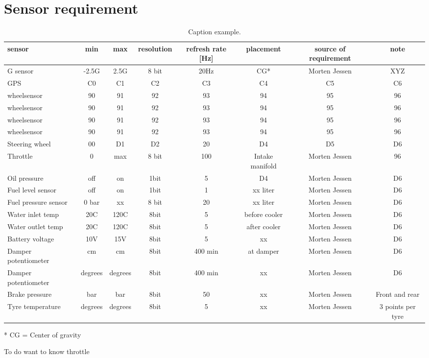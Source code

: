 \chapter{Sensor requirement}

\begin{landscape}
\begin{table}[htbp]
\centering
\begin{tabular} {l c c c c c c c }
\toprule
sensor & min	& max 	& resolution 	& refresh rate [Hz]	& placement 	& source of requirement & note	\\
\midrule
G sensor 	& -2.5G	& 2.5G	& 8 bit	 & 20Hz & CG* & Morten Jessen & XYZ\\
GPS 	& C0	& C1	& C2	& C3	& C4	& C5	& C6 \\
wheelsensor & 90	& 91	& 92	& 93	& 94	& 95	& 96 \\
wheelsensor & 90	& 91	& 92	& 93	& 94	& 95	& 96 \\
wheelsensor & 90	& 91	& 92	& 93	& 94	& 95	& 96 \\
wheelsensor & 90	& 91	& 92	& 93	& 94	& 95	& 96 \\
Steering wheel & 00	& D1	& D2	& 20		& D4				& D5			& D6 \\
Throttle  		& 0	& max	& 8 bit	&  100	& Intake manifold 	& Morten Jessen	& 96  \\
Oil pressure & off	& on	& 1bit 	& 5		& D4				& Morten Jessen			& D6 \\
Fuel level sensor & off	& on	& 1bit 	& 1		&  xx liter			& Morten Jessen			& D6 \\
Fuel pressure sensor & 0 bar	& xx	& 8 bit 	& 20		&  xx liter			& Morten Jessen			& D6 \\
Water inlet temp & 20C	& 120C	& 8bit 	& 5		&  before cooler			& Morten Jessen			& D6 \\
Water outlet temp & 20C	& 120C	& 8bit 	& 5		&  after cooler			& Morten Jessen			& D6 \\
Battery voltage & 10V	& 15V	& 8bit 	& 5		&  xx			& Morten Jessen			& D6 \\
Damper potentiometer & cm	& cm	& 8bit 	& 400 min		&  at damper			& Morten Jessen			& D6 \\
Damper potentiometer & degrees	& degrees	& 8bit 	& 400 min		&  xx			& Morten Jessen			& D6 \\
Brake pressure & bar	& bar	& 8bit 	& 50		&  xx			& Morten Jessen			& Front and rear \\
Tyre temperature & degrees	& degrees	& 8bit 	& 5		&  xx			& Morten Jessen			& 3 points per tyre \\
\bottomrule
\end{tabular}
\caption{Caption example.}
\label{tab:label_example}
\end{table}

* CG = Center of gravity 

To do 
want to know throttle 

\end{landscape}

